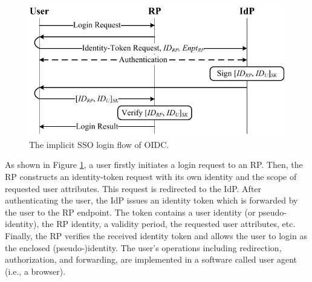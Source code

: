 \begin{figure}[t]
  \centering
  \includegraphics[width=0.88\linewidth]{fig/OIDC1.pdf}
  \caption{The implicit SSO login flow of OIDC.}
  \label{fig:OpenID}
\end{figure}

As shown in Figure \ref{fig:OpenID}, a user firstly initiates a login request to an RP.
Then, the RP constructs an identity-token request with its own identity
 and the scope of requested user attributes.
This request is redirected to the IdP.
After authenticating the user,
    the IdP issues an identity token
        which is forwarded by the user to the RP endpoint.
The token contains a user identity (or pseudo-identity),
    the RP identity, a validity period, the requested user attributes, etc.
Finally, the RP verifies the received identity token and
 allows the user to login as the  enclosed (pseudo-)identity.
The user's operations including redirection, authorization, and forwarding,
    are implemented in a software called user agent (i.e., a browser).




